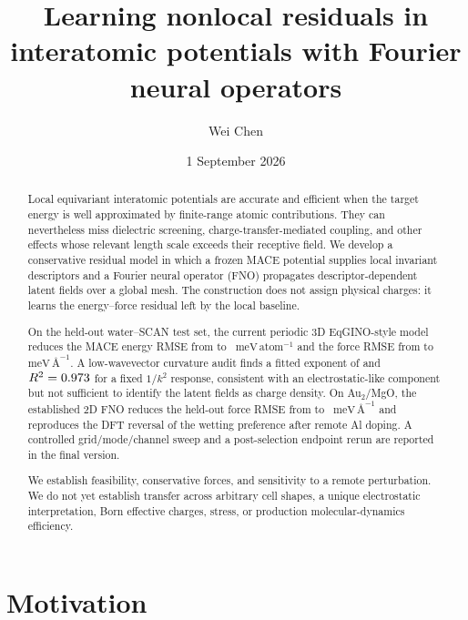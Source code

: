 \documentclass[11pt]{article}
\title{\textbf{Learning nonlocal residuals in interatomic potentials with Fourier neural operators}}
\author{Wei Chen}
\date{1 September 2026}
\newcommand{\meva}{\ensuremath{\mathrm{meV\,\text{\AA}^{-1}}}}
\newcommand{\mevpa}{\ensuremath{\mathrm{meV\,atom^{-1}}}}
\begin{document}
\maketitle

\begin{abstract}
Local equivariant interatomic potentials are accurate and efficient when the
target energy is well approximated by finite-range atomic contributions. They
can nevertheless miss dielectric screening, charge-transfer-mediated
coupling, and other effects whose relevant length scale exceeds their
receptive field. We develop a conservative residual model in which a frozen
MACE potential supplies local invariant descriptors and a Fourier neural
operator (FNO) propagates descriptor-dependent latent fields over a global
mesh. The construction does not assign physical charges: it learns the
energy--force residual left by the local baseline.

On the held-out water--SCAN test set, the current periodic 3D EqGINO-style
model reduces the MACE energy RMSE from \WaterMaceEnergy{} to
\WaterFnoEnergy{}~\mevpa{} and the force RMSE from \WaterMaceForce{} to
\WaterFnoForce{}~\meva{}. A low-wavevector curvature audit finds a fitted
exponent of \WaterSpectralExponent{} and \(R^2=0.973{}\) for a
fixed \(1/k^2\) response, consistent with an electrostatic-like component but
not sufficient to identify the latent fields as charge density. On
Au$_2$/MgO, the established 2D FNO reduces the held-out force RMSE from
\AuMaceForce{} to \AuFnoForce{}~\meva{} and reproduces the DFT reversal of the
wetting preference after remote Al doping. A controlled grid/mode/channel
sweep and a post-selection endpoint rerun are reported in the final version.

We establish feasibility, conservative forces, and sensitivity to a remote
perturbation. We do not yet establish transfer across arbitrary cell shapes,
a unique electrostatic interpretation, Born effective charges, stress, or
production molecular-dynamics efficiency.
\end{abstract}

\section{Motivation}
\end{document}
